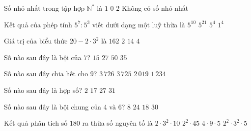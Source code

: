 \begin{ex}%
	Số nhỏ nhất trong tập hợp $\mathbb{N}^*$ là
	\choice
	{\True $1$}
	{$0$}
	{$2$}
	{Không có số nhỏ nhất}
\end{ex}

\begin{ex}%
	Kết quả của phép tính $5^7 : 5^3$ viết dưới dạng một luỹ thừa là
	\choice
	{$5^{10}$}
	{$5^{21}$}
	{\True $5^4$}
	{$1^4$}
\end{ex}

\begin{ex}%
	Giá trị của biểu thức $20 - 2 \cdot 3^2$ là
	\choice
	{$162$}
	{\True $2$}
	{$14$}
	{$4$}
\end{ex}

\begin{ex}%
	Số nào sau đây là bội của $7$?
	\choice
	{$15$}
	{$27$}
	{$50$}
	{\True $35$}
\end{ex}

\begin{ex}%
	Số nào sau đây chia hết cho $9$?
	\choice
	{\True $3\,726$}
	{$3\,725$}
	{$2\,019$}
	{$1\,234$}
\end{ex}

\begin{ex}%
	Số nào sau đây là hợp số?
	\choice
	{$2$}
	{$17$}
	{\True $27$}
	{$31$}
\end{ex}

\begin{ex}%
	Số nào sau đây là bội chung của $4$ và $6$?
	\choice
	{$8$}
	{\True $24$}
	{$18$}
	{$30$}
\end{ex}

\begin{ex}%
	Kết quả phân tích số $180$ ra thừa số nguyên tố là
	\choice
	{$2 \cdot 3^2 \cdot 10$}
	{$2^2 \cdot 45$}
	{$4 \cdot 9 \cdot 5$}
	{\True $2^2 \cdot 3^2 \cdot 5$}
\end{ex}

